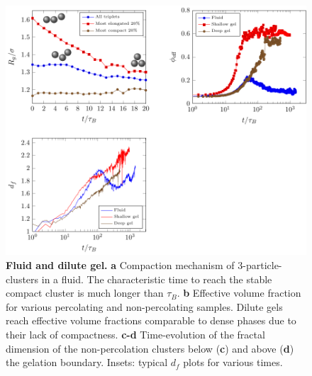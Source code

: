 \clearpage
\begin{figure}
	\begin{center}
	\includegraphics{generate-figure1.pdf}
	\end{center}
	\caption{\textbf{Fluid and dilute gel.} \textbf{a} Compaction mechanism of 3-particle-clusters in a fluid. The characteristic time to reach the stable compact cluster is much longer than $\tau_B$. \textbf{b} Effective volume fraction for various percolating and non-percolating samples. Dilute gels reach effective volume fractions comparable to dense phases due to their lack of compactness. \textbf{c-d} Time-evolution of the fractal dimension of the non-percolation clusters below (\textbf{c}) and above (\textbf{d}) the gelation boundary. Insets: typical $d_f$ plots for various times.}
	\label{fig:fluid_dilute}
\end{figure}


